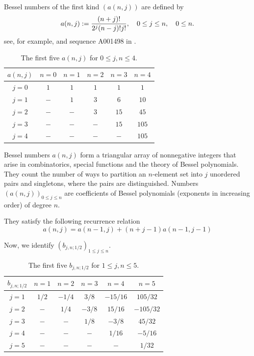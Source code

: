 \documentclass[a4paper,12pt]{amsart}
\theoremstyle{definition}
\theoremstyle{remark}
\begin{document}
Bessel numbers of the first kind $(a(n,j))$ are defined by
$$ a(n,j):= {(n+j)!\over 2^j(n-j)!j!}, \quad 0\le j\le n, \quad 0\le n.$$
see, for example, \cite[p.18]{G} and sequence A001498 in \cite{sloane}.


\begin{table}[h]\label{TableBN}\small{
\centering
\begin{tabular}{c|ccccc}
$a(n,j)$ &$n=0$ &$n=1$ & $n=2$ & $n=3$ & $n=4$ \\ \hline
$j=0$ & $1$ &$1$ & $1$ & $1$ & $1$ \\
$j=1$ & $-$ & $1$ & $3$ & $6$ & $10$ \\
$j=2$ & $-$ & $-$ & $3$ & $15$ & $45$ \\
$j=3$ & $-$ & $-$ & $-$ & $15$ & $105$ \\
$j=4$ & $-$ & $-$ & $-$ & $-$ & $105$ \\
\end{tabular}
\vspace{2pt}}
\caption{\small The first five $a(n,j)$ for $0\le j,n\le 4.$}
\end{table}




 {Bessel numbers} $a(n,j)$ form a triangular array of nonnegative integers that arise in combinatorics,
special functions and the theory of Bessel polynomials.
They count the number of ways to partition an
$n$-element set into
$j$ unordered pairs and singletons, where the pairs are distinguished. Numbers $(a(n,j))_{0\le j\le n}$ are coefficients of Bessel polynomials (exponents in increasing order) of degree $n$.


They satisfy the following recurrence relation
$$
a(n,j)=a(n-1,j)+{(n+j-1)}a(n-1,j-1)
$$

Now, we identify
$(b_{j,n;1/2})_{1\le j\le n}$.


\begin{table}[h]\label{Tableb1/2}
\centering\small{
\begin{tabular}{c|ccccc}
$b_{j,n;1/2}$ & $n=1$ & $n=2$ & $n=3$ & $n=4$ & $n=5$ \\\hline
$j=1$ & $1/2$ & $-1/4$ & $3/8$ & $-15/16$ & $105/32$ \\[1mm]
$j=2$ & $-$ & $1/4$ & $-3/8$ & $15/16$ & $-105/32$ \\[1mm]
$j=3$ & $-$ & $-$ & $1/8$ & $-3/8$ & $45/32$ \\[1mm]
$j=4$ & $-$ & $-$ & $-$ & $1/16$ & $-5/16$ \\[1mm]
$j=5$ & $-$ & $-$ & $-$ & $-$ & $1/32$\\[1mm]
\end{tabular}
\vspace{2pt}}
\caption{\small The first five $b_{j,n;1/2}$ for $1\le j,n\le 5.$}
\end{table}
\end{document}
